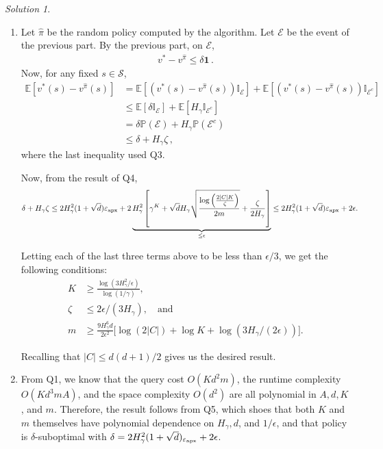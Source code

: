 \documentclass{article}
\newcommand{\cE}{\mathcal{E}}
\newcommand{\oneb}[1]{\mathbb{I}_{#1}}
\DeclareMathOperator*{\1}{\mathbbm{1}}
\newcommand{\E}{\mathbb E}
\newcommand{\Prob}[1]{\mathbb{P}( #1 )}
\newcommand{\EE}[1]{\E[#1]}
\newcommand{\0}{\mathbf{0}}
\theoremstyle{definition}
\theoremstyle{remark}
\newtheorem*{solution*}{Solution}
\theoremstyle{theorem}
\newcommand{\cS}{\mathcal{S}}
\begin{document}
\begin{solution*}
\begin{enumerate}
\item 
Let $\hat \pi$ be the random policy computed by the algorithm.
Let $\mathcal{E}$ be the event of the previous part.
By the previous part, on $\mathcal{E}$,
\begin{align*}
v^* - v^{\hat \pi} \le \delta \boldsymbol{1}\,.
\end{align*}
Now, for any fixed $s\in \cS$, 
\begin{align*}
\EE{ v^*(s)-v^{\hat \pi}(s) } 
&= \EE{ (v^*(s)-v^{\hat \pi}(s))\oneb{\cE} } + \EE{ (v^*(s)-v^{\hat \pi}(s))\oneb{\cE^c} }  \\
&\le \EE{ \delta\oneb{\cE} } + \EE{H_\gamma \oneb{\cE^c} }  \\
&= \delta \Prob{\cE} + H_\gamma \Prob{\cE^c}   \\
&\le \delta + H_\gamma \zeta\,,
\end{align*}
where the last inequality used Q3.

Now, from the result of Q4,
  \begin{align*}
    \delta +
    H_\gamma\zeta
    &\le 2 H_\gamma^2 (1 + \sqrt{d}) \varepsilon_{\textrm{apx}} + 2 \underbrace{H_\gamma^2  \left[ \gamma^K + \sqrt{d} H_\gamma \sqrt{\frac{\log \left(\frac{2|C|K}{\zeta} \right)}{2m}} + \frac{\zeta}{2H_\gamma} \right]}_{\leq \epsilon} \leq 2 H_\gamma^2 (1 + \sqrt{d}) \varepsilon_{\textrm{apx}} + 2 \epsilon.
  \end{align*}

  Letting each of the last three terms above to be less than $\epsilon/3$, we get the following conditions:
  \begin{align*}
    K &\geq \frac{\log\left(3 H_\gamma^2/\epsilon \right)}{\log(1 / \gamma)}, \\
    \zeta &\leq 2\epsilon/(3H_\gamma), \quad \text{and} \\
    m &\geq \frac{9 H_\gamma^6 d}{2 \epsilon^2} \Bigg[\log(2|C|) + \log K + \log \left(3 H_\gamma / (2\epsilon) \right) \Bigg].
  \end{align*}

  Recalling that $|C| \leq d(d+1)/2$ gives us the desired result.
  
\item From Q1, we know that the query cost $O(Kd^2m)$, the runtime complexity $O(Kd^3mA)$, and the space complexity $O(d^2)$ are all polynomial in $A, d, K$, and $m$. Therefore, the result follows from Q5, which shoes that both $K$ and $m$ themselves have polynomial dependence on $H_\gamma, d$, and $1/\epsilon$, and that policy is $\delta$-suboptimal with $\delta = 2H_\gamma^2 (1 + \sqrt{d})_{\varepsilon_{\textrm{apx}}} + 2 \epsilon$.
  

\end{enumerate}
\end{solution*}
\end{document}
